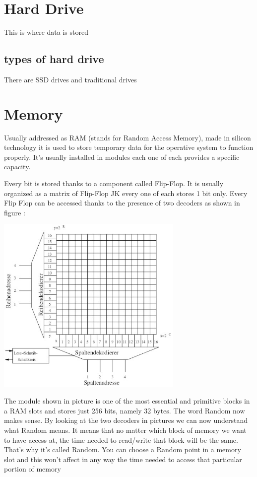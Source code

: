 \documentclass[a4paper,12pt]{article}
\begin{document}

\clearpage

\section{Hard Drive}
This is where data is stored
\subsection{types of hard drive}
There are SSD drives and traditional drives
\clearpage

\section{Memory}

Usually addressed as RAM (stands for Random Access Memory), made in silicon technology it is used to store temporary data for the operative system to function properly. It's usually installed in modules each one of each provides a specific capacity.

Every bit is stored thanks to a component called Flip-Flop. It is usually organized as a matrix of Flip-Flop JK every one of each stores 1 bit only. Every Flip Flop can be accessed thanks to the presence of two decoders as shown in figure :
 
\includegraphics[width=9cm]{./DRAM-02.jpg}

The module shown in picture is one of the most essential and primitive blocks in a RAM slots and stores just 256 bits, namely 32 bytes. 
The word Random now makes sense. By looking at the two decoders in pictures we can now understand what Random means. It means that no matter which block of memory we want to have access at, the time needed to read/write that block will be the same. That's why it's called Random. You can choose a Random point in a memory slot and this won't affect in any way the time needed to access that particular portion of memory
\end{document}
